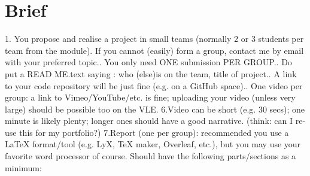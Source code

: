 \thispagestyle{empty}
\section*{Brief}
1. You propose and realise a project in small teams (normally 2 or 3 students per team from the module). If you cannot (easily) form a group, contact me by email with your preferred topic.\newline {}. You only need ONE submission PER GROUP.\newline {}. Do put a READ ME.text saying : who (else)is on the team, title of project.\newline {}. A link to your code repository will be just fine (e.g. on a GitHub space).\newline {}. One video per group: a link to Vimeo/YouTube/etc. is fine; uploading your video (unless very large) should be possible too on the VLE.\newline \newline
6.Video can be short (e.g. 30 secs); one minute is likely plenty; longer ones should have a good narrative. (think: can I re-use this for my portfolio?)\newline \newline
7.Report (one per group): recommended you use a LaTeX format/tool (e.g. LyX, TeX maker, Overleaf, etc.), but you may use your favorite word processor of course. Should have the following parts/sections as a minimum:\newline \newline

